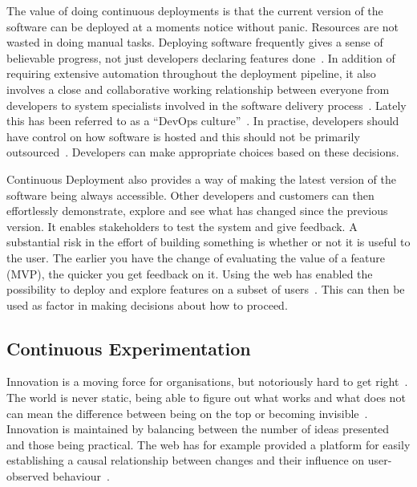 \documentclass[english]{tktltiki2}
\begin{document}
The value of doing continuous deployments is that the current version of the software can be deployed at a moments notice without panic. Resources are not wasted in doing manual tasks. Deploying software frequently gives a sense of believable progress, not just developers declaring features done~\cite{Fow13a}. In addition of requiring extensive automation throughout the deployment pipeline, it also involves a close and collaborative working relationship between everyone from developers to system specialists involved in the software delivery process~\cite{HAB12, Fow13a}. Lately this has been referred to as a “DevOps culture”~\cite{Fow13a}. In practise, developers should have control on how software is hosted and this should not be primarily outsourced~\cite{HF11}. Developers can make appropriate choices based on these decisions.

Continuous Deployment also provides a way of making the latest version of the software being always accessible. Other developers and customers can then effortlessly demonstrate, explore and see what has changed since the previous version. It enables stakeholders to test the system and give feedback. A substantial risk in the effort of building something is whether or not it is useful to the user. The earlier you have the change of evaluating the value of a feature (MVP), the quicker you get feedback on it. Using the web has enabled the possibility to deploy and explore features on a subset of users~\cite{Fow06, Fow13a}. This can then be used as factor in making decisions about how to proceed.

\subsection{Continuous Experimentation}

Innovation is a moving force for organisations, but notoriously hard to get right~\cite{BE12}. The world is never static, being able to figure out what works and what does not can mean the difference between being on the top or becoming invisible~\cite{KLS09}. Innovation is maintained by balancing between the number of ideas presented and those being practical. The web has for example provided a platform for easily establishing a causal relationship between changes and their influence on user-observed behaviour~\cite{KLS09}.
\end{document}
